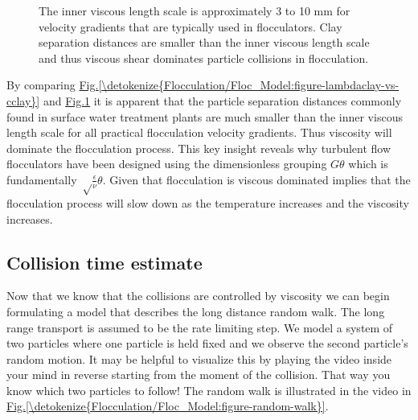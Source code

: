 \documentclass[letterpaper,10pt,english]{sphinxmanual}
\let\sphinxpxdimen\pdfpxdimen\else\newdimen\sphinxpxdimen
\begin{document}
\begin{figure}[htbp]
\centering
\capstart

\noindent\sphinxincludegraphics[width=400\sphinxpxdimen]{{innerviscous_vs_G}.png}
\caption{The inner viscous length scale is approximately 3 to 10 mm for velocity gradients that are typically used in flocculators. Clay separation distances are smaller than the inner viscous length scale and thus viscous shear dominates particle collisions in flocculation.}\label{\detokenize{Flocculation/Floc_Model:id35}}\label{\detokenize{Flocculation/Floc_Model:figure-innerviscous-vs-g}}\end{figure}

By comparing \hyperref[\detokenize{Flocculation/Floc_Model:figure-lambdaclay-vs-cclay}]{Fig.\@ \ref{\detokenize{Flocculation/Floc_Model:figure-lambdaclay-vs-cclay}}} and \hyperref[\detokenize{Flocculation/Floc_Model:figure-innerviscous-vs-g}]{Fig.\@ \ref{\detokenize{Flocculation/Floc_Model:figure-innerviscous-vs-g}}} it is apparent that the particle separation distances commonly found in surface water treatment plants are much smaller than the inner viscous length scale for all practical flocculation velocity gradients. Thus viscosity will dominate the flocculation process. This key insight reveals why turbulent flow flocculators have been designed using the dimensionless grouping \(G \theta\) which is fundamentally \(\sqrt\frac{\epsilon}{\nu} \theta\). Given that flocculation is viscous dominated implies that the flocculation process will slow down as the temperature increases and the viscosity increases.


\subsection{Collision time estimate}
\label{\detokenize{Flocculation/Floc_Model:collision-time-estimate}}
Now that we know that the collisions are controlled by viscosity we can begin formulating a model that describes the long distance random walk. The long range transport is assumed to be the rate limiting step. We model a system of two particles where one particle is held fixed and we observe the second particle’s random motion. It may be helpful to visualize this by playing the video inside your mind in reverse starting from the moment of the collision. That way you know which two particles to follow! The random walk is illustrated in the video in \hyperref[\detokenize{Flocculation/Floc_Model:figure-random-walk}]{Fig.\@ \ref{\detokenize{Flocculation/Floc_Model:figure-random-walk}}}.
\end{document}

